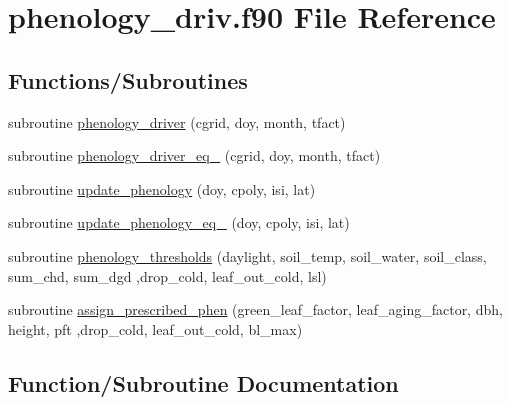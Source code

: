 \hypertarget{phenology__driv_8f90}{}\section{phenology\+\_\+driv.\+f90 File Reference}
\label{phenology__driv_8f90}
\subsection*{Functions/\+Subroutines}
\begin{DoxyCompactItemize}
\item 
subroutine \hyperlink{phenology__driv_8f90_aebe550e627508a275e8a1000e3bc9c13}{phenology\+\_\+driver} (cgrid, doy, month, tfact)
\item 
subroutine \hyperlink{phenology__driv_8f90_ab9a0459d8cb63117c39488527da2a451}{phenology\+\_\+driver\+\_\+eq\+\_} (cgrid, doy, month, tfact)
\item 
subroutine \hyperlink{phenology__driv_8f90_a133c291d6ae8cda0fb270023203ff229}{update\+\_\+phenology} (doy, cpoly, isi, lat)
\item 
subroutine \hyperlink{phenology__driv_8f90_aad3dbb3ae553616293acf71ccc09158a}{update\+\_\+phenology\+\_\+eq\+\_} (doy, cpoly, isi, lat)
\item 
subroutine \hyperlink{phenology__driv_8f90_aa404fdf30b88343b2c85cd24c096a06e}{phenology\+\_\+thresholds} (daylight, soil\+\_\+temp, soil\+\_\+water, soil\+\_\+class, sum\+\_\+chd, sum\+\_\+dgd                                                                                                                               ,drop\+\_\+cold, leaf\+\_\+out\+\_\+cold, lsl)
\item 
subroutine \hyperlink{phenology__driv_8f90_aabac28b5c2ec4bdad019f3e1b716033e}{assign\+\_\+prescribed\+\_\+phen} (green\+\_\+leaf\+\_\+factor, leaf\+\_\+aging\+\_\+factor, dbh, height, pft                                                                                                                                                       ,drop\+\_\+cold, leaf\+\_\+out\+\_\+cold, bl\+\_\+max)
\end{DoxyCompactItemize}


\subsection{Function/\+Subroutine Documentation}
\hypertarget{phenology__driv_8f90_aabac28b5c2ec4bdad019f3e1b716033e}{}

